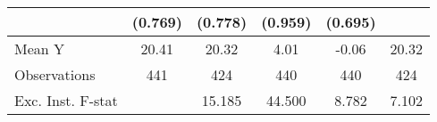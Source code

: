 {\begin{tabular}{l*{5}{c}}
            &     (0.769)         &     (0.778)         &     (0.959)         &     (0.695)         &                     \\
\midrule
Mean Y      &       20.41         &       20.32         &        4.01         &       -0.06         &       20.32         \\
Observations&         441         &         424         &         440         &         440         &         424         \\
Exc. Inst. F-stat&                     &      15.185         &      44.500         &       8.782         &       7.102         \\
\bottomrule
\end{tabular}
}
